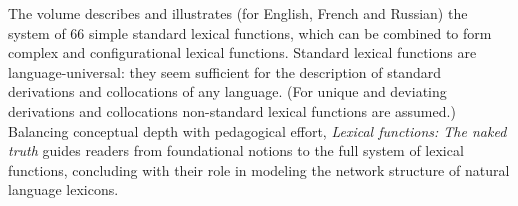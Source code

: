 {The volume describes and illustrates (for English, French and Russian) the system of 66 simple standard lexical functions, which can be combined to form complex and configurational lexical functions. Standard lexical functions are language-universal: they seem sufficient for the description of standard derivations and collocations of any language. (For unique and deviating derivations and collocations non-standard lexical functions are assumed.) Balancing conceptual depth with pedagogical effort, \textit{Lexical functions: The naked truth} guides readers from foundational notions to the full system of lexical functions, concluding with their role in modeling the network structure of natural language lexicons.
}
\dedication{To Lidija Iordanskaja, with love.}

\renewcommand{\lsSeries}{tbls}
\renewcommand{\lsSeriesNumber}{21}
\renewcommand{\lsID}{612}
\renewcommand{\lsISBNdigital}{978-3-96110-598-4}
\renewcommand{\lsISBNsoftcover}{978-3-98554-215-4}

